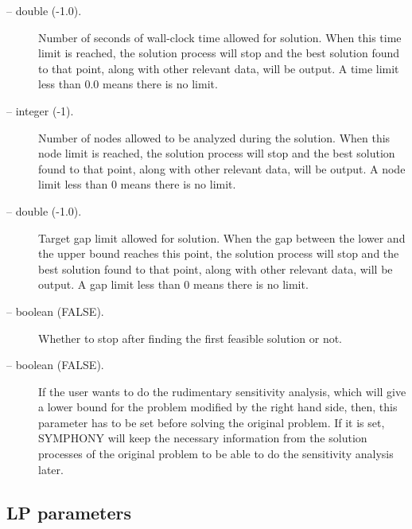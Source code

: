 \begin{description}
\item[ -- double (-1.0).] 
Number of seconds of wall-clock time allowed for solution. When this
time limit is reached, the solution process will stop and the best
solution found to that point, along with other relevant data, will be
output. A time limit less than 0.0 means there is no limit.

\item[ -- integer (-1).] 
Number of nodes allowed to be analyzed during the solution. When this
node limit is reached, the solution process will stop and the best
solution found to that point, along with other relevant data, will be
output. A node limit less than 0 means there is no limit. 

\item[ -- double (-1.0).] 
Target gap limit allowed for solution. When the gap between the lower and 
the upper bound reaches this point, the solution process will stop and the 
best solution found to that point, along with other relevant data, will be
output. A gap limit less than 0 means there is no limit.

\item[ -- boolean (FALSE).]
Whether to stop after finding the first feasible solution or not. 

\item[ -- boolean (FALSE).] 
If the user wants to do the rudimentary sensitivity analysis, which will 
give a lower bound for the problem modified by the right hand side, then, 
this parameter has to be set before solving the original problem. If it 
is set, SYMPHONY will keep the necessary information from the solution 
processes of the original problem to be able to do the sensitivity analysis 
later.  

\end{description}

\subsection{LP parameters}

